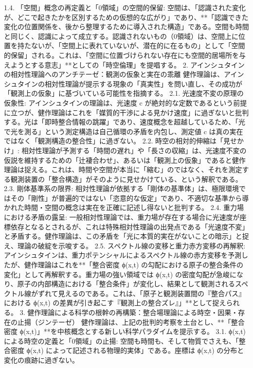 \documentclass{article}
\begin{document}
1.4. 「空間」概念の再定義と「0領域」の空間的保留:
空間は、「認識された変化が、どこで起きたかを区別するための仮想的な広がり」であり、**「認識できた変化の位置関係を、後から整理するために導入された構造」である。空間も時間と同じく、認識によって成立する。認識されないもの（0領域）は、空間上に位置を持たないが、「空間上に表れていないが、潜在的に在るもの」として「空間的保留」される。これは、「空間に位置づけられない存在にも空間的居場所を与えようとする意志」**としての「時空倫理」を提唱する。
2. アインシュタインの相対性理論へのアンチテーゼ：観測の仮象と実在の乖離
健作理論は、アインシュタインの相対性理論が提示する現象の「真実性」を問い直し、その成功が「観測上の仮象」に基づいている可能性を指摘する。
2.1. 光速度不変の原理の仮象性:
アインシュタインの理論は、光速度 c が絶対的な定数であるという前提に立つが、健作理論はこれを「媒質的干渉による見かけ速度」に過ぎないと批判する。光は「即時整合情報の跳躍」であり、速度概念を超越しているため、「光で光を測る」という測定構造は自己循環の矛盾を内包し、測定値 c は真の実在ではなく「観測構造の整合性」に過ぎない。
2.2. 時空の相対的伸縮は「見せかけ」:
相対性理論が予測する「時間の遅れ」や「長さの収縮」は、光速度不変の仮説を維持するための「辻褄合わせ」、あるいは「観測上の仮象」であると健作理論は捉える。これは、時間や空間が本当に「縮む」のではなく、それを測定する観測装置の「整合構造」がそのように見せかけている、という解釈である。
2.3. 剛体基準系の限界:
相対性理論が依拠する「剛体の基準体」は、極限環境ではその「剛性」が普遍的ではない「恣意的な仮定」であり、不適切な基準から導かれた時間・空間の概念は実在を正確に記述し得ないと批判する。
2.4. 重力場における矛盾の露呈:
一般相対性理論では、重力場が存在する場合に光速度が座標依存となるとされるが、これは特殊相対性理論の出発点である「光速度不変」と矛盾する。健作理論は、この矛盾を「光に本質的実在がないことの暗示」と捉え、理論の破綻を示唆する。
2.5. スペクトル線の変移と重力赤方変移の再解釈:
アインシュタインは、重力ポテンシャルによるスペクトル線の赤方変移を予測したが、健作理論はこれを**「整合密度 ϕ(x,t) の勾配における原子の整合条件の変化」として再解釈する。重力場の強い領域では ϕ(x,t) の密度勾配が急峻になり、原子の内部構造における「整合条件」が変化し、結果として観測されるスペクトル線がずれて見えるのである。これは、「原子と観測装置間の『整合パス』における ϕ(x,t) の差異が引き起こす『観測上の整合ズレ』」**として捉えられる。
3. 健作理論による科学の根幹の再構築：整合場理論による時空・因果・存在の止揚（ジンテーゼ）
健作理論は、上記の批判的考察を土台とし、**「整合密度 ϕ(x,t)」**を中核概念とする新しい科学パラダイムを提示する。
3.1. ϕ(x,t) による時空の定義と「0領域」の止揚:
空間も時間も、そして物質でさえも、「整合密度 ϕ(x,t) によって記述される物理的実体」である。座標は ϕ(x,t) の分布と変化の痕跡に過ぎない。
\end{document}
